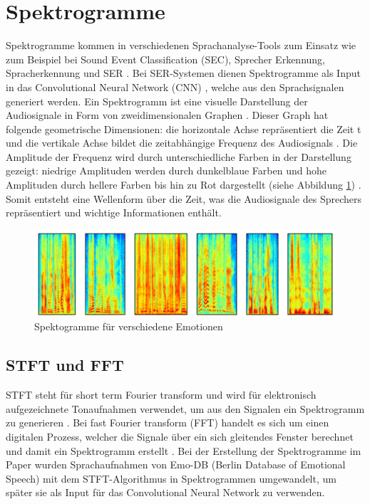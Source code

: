 \section{Spektrogramme}
Spektrogramme kommen in verschiedenen Sprachanalyse-Tools zum Einsatz wie zum Beispiel bei Sound Event Classification (SEC), Sprecher Erkennung, Spracherkennung und SER \cite{spectrogram}.
Bei SER-Systemen dienen Spektrogramme als Input in das Convolutional Neural Network (CNN) \cite{cnn}, welche aus den Sprachsignalen generiert werden. 
Ein Spektrogramm ist eine visuelle Darstellung der Audiosignale in Form von zweidimensionalen Graphen \cite{spectrogram}. Dieser Graph hat folgende geometrische Dimensionen: die horizontale Achse repräsentiert die Zeit t und die vertikale Achse bildet die zeitabhängige Frequenz des Audiosignals \cite{badshah2019deep}. Die Amplitude der Frequenz wird durch unterschiedliche Farben in der Darstellung gezeigt: niedrige Amplituden werden durch dunkelblaue Farben und hohe Amplituden durch hellere Farben bis hin zu Rot dargestellt (siehe Abbildung \ref{spektogram}) \cite{spectrogram}. Somit entsteht eine Wellenform über die Zeit, was die Audiosignale des Sprechers repräsentiert und wichtige Informationen enthält. 
\begin{figure}[ht]
	\centering
	\includegraphics[width=1\textwidth]{images/spekto.PNG}
	\caption{\label{spektogram}Spektogramme für verschiedene Emotionen \cite{badshah2019deep}}
\end{figure}
\subsection{STFT und FFT}
STFT steht für short term Fourier transform und wird für elektronisch aufgezeichnete Tonaufnahmen verwendet, um aus den Signalen ein Spektrogramm zu generieren \cite{badshah2019deep}. Bei fast Fourier transform (FFT) handelt es sich um einen digitalen Prozess, welcher die Signale über ein sich gleitendes Fenster berechnet und damit ein Spektrogramm erstellt \cite{badshah2019deep}. Bei der Erstellung der Spektrogramme im Paper \cite{badshah2019deep} wurden Sprachaufnahmen von Emo-DB (Berlin Database of Emotional Speech) mit dem STFT-Algorithmus in Spektrogrammen umgewandelt, um später sie als Input für das Convolutional Neural Network zu verwenden.

